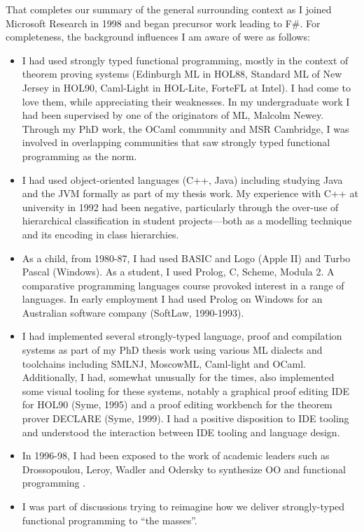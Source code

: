 \documentclass[acmsmall]{acmart}\settopmatter{}
\begin{document}
That completes our summary of the general surrounding context as I joined Microsoft Research in 1998 and began precursor work leading to F\#. For completeness,
the background influences I am aware of were as follows:

\begin{itemize}
\item I had used strongly typed functional programming, mostly in the context of theorem proving systems (Edinburgh ML in HOL88, Standard ML
of New Jersey in HOL90, Caml-Light in HOL-Lite, ForteFL at Intel). I had come to love them, while appreciating their weaknesses. In my undergraduate work
I had been supervised by one of the originators of ML, Malcolm Newey. Through my PhD work, the OCaml community and MSR Cambridge, I was
involved in overlapping communities that saw strongly typed functional programming as the norm.
\item I had used object-oriented languages (C++, Java) including studying Java and the JVM formally as part of my thesis work.  My
experience with C++ at university in 1992 had been negative, particularly through the over-use of hierarchical classification in student
projects---both as a modelling technique and its encoding in class hierarchies.  
\item As a child, from 1980-87, I had used BASIC and Logo (Apple II) and Turbo Pascal (Windows). As a student, I used Prolog, C, Scheme, Modula 2. A
comparative programming languages course provoked interest in a range of languages. In early employment I had used Prolog on Windows for an Australian
software company (SoftLaw, 1990-1993). 
\item I had implemented several strongly-typed language, proof and compilation systems as part of my PhD thesis work using various ML dialects and
toolchains including SMLNJ, MoscowML, Caml-light and OCaml. Additionally, I had, somewhat unusually for the times, also implemented some visual tooling
for these systems, notably a graphical proof editing IDE for HOL90 (Syme, 1995) and a proof editing workbench for the theorem prover DECLARE (Syme, 1999).  I
had a positive disposition to IDE tooling and understood the interaction between IDE tooling and language design.
\item In 1996-98, I had been exposed to the work of academic leaders such as Drossopoulou, Leroy, Wadler and Odersky to synthesize OO and functional
programming \citep{alvesfoss99}.
\item I was part of discussions trying to reimagine how we deliver strongly-typed functional programming to “the masses”.
\end{itemize}
\end{document}
